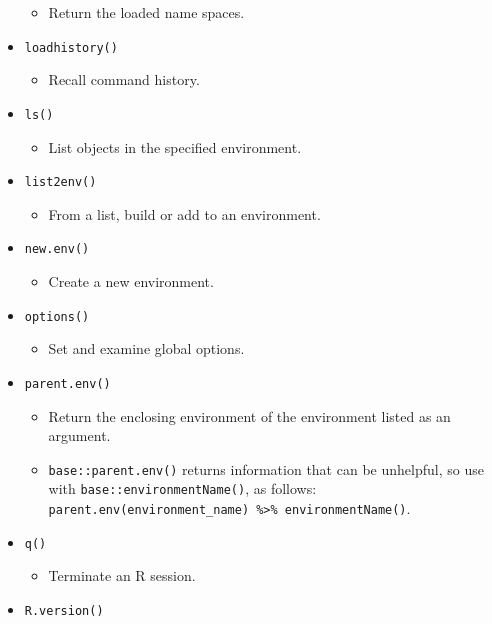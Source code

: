 \documentclass[
]{book}
\providecommand{\tightlist}{%
  \setlength{\itemsep}{0pt}\setlength{\parskip}{0pt}}
\begin{document}
\begin{itemize}
  \begin{itemize}
  \tightlist
  \item
    Return the loaded name spaces.
  \end{itemize}
\item
  \texttt{loadhistory()}

  \begin{itemize}
  \tightlist
  \item
    Recall command history.
  \end{itemize}
\item
  \texttt{ls()}

  \begin{itemize}
  \tightlist
  \item
    List objects in the specified environment.
  \end{itemize}
\item
  \texttt{list2env()}

  \begin{itemize}
  \tightlist
  \item
    From a list, build or add to an environment.
  \end{itemize}
\item
  \texttt{new.env()}

  \begin{itemize}
  \tightlist
  \item
    Create a new environment.
  \end{itemize}
\item
  \texttt{options()}

  \begin{itemize}
  \tightlist
  \item
    Set and examine global options.
  \end{itemize}
\item
  \texttt{parent.env()}

  \begin{itemize}
  \tightlist
  \item
    Return the enclosing environment of the environment listed as an argument.
  \item
    \texttt{base::parent.env()} returns information that can be unhelpful, so use with \texttt{base::environmentName()}, as follows: \texttt{parent.env(environment\_name)\ \%\textgreater{}\%\ environmentName()}.
  \end{itemize}
\item
  \texttt{q()}

  \begin{itemize}
  \tightlist
  \item
    Terminate an R session.
  \end{itemize}
\item
  \texttt{R.version()}


\end{itemize}
\end{document}
